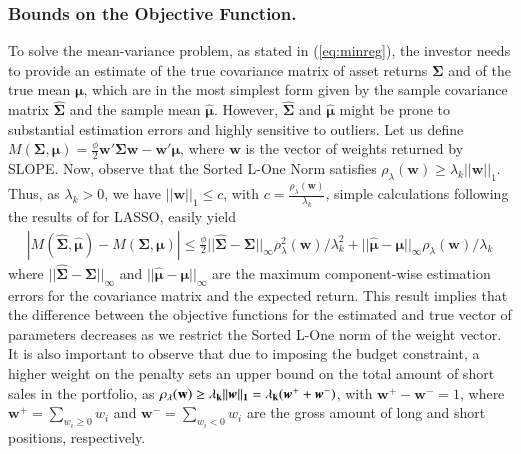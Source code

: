 \documentclass[12pt, a4paper]{article}
\newcommand{\bfw}{\boldsymbol{w} }
\newcommand{\bfmu}{\boldsymbol{\mu} }
\newcommand{\bfSigma}{\boldsymbol{\Sigma} }
\begin{document}
\subsubsection*{Bounds on the Objective Function.}
To solve the mean-variance problem, as stated in (\ref{eq:minreg}), the investor needs to provide an estimate of the true covariance matrix of asset returns $\bfSigma$ and of the true mean $\bfmu$, which are in the most simplest form given by the sample covariance matrix $\hat{\bfSigma}$ and the sample mean $\hat{\bfmu}$. However, $\hat{\bfSigma}$ and $\hat{\bfmu}$ might be prone to substantial estimation errors and highly sensitive to outliers. Let us define $M(\bfSigma, \bfmu)= \frac{\phi}{2} \bfw'\bfSigma \bfw - \bfw'\bfmu$, where $\bfw$ is the vector of weights returned by SLOPE. Now, observe that the Sorted L-One Norm satisfies $\rho_{\lambda}(\bfw)\geq \lambda_k ||\bfw||_1$. Thus, as $\lambda_k>0$, we have $||\bfw||_{1} \leq c$, with $c=\frac{\rho_{\lambda}(\bfw)}{\lambda_{k}}$, simple calculations following the results of \cite{Fan2012} for LASSO, easily yield
\begin{gather}
|M(\widehat{\bfSigma}, \hat{\bfmu}) - M(\bfSigma, \bfmu)| \leq \frac{\phi}{2} ||\widehat{\bfSigma} - \bfSigma||_{\infty} \rho_{\lambda}^2(\bfw)/\lambda^2_k + ||\hat{\bfmu} - \bfmu||_{\infty} \rho_{\lambda}(\bfw)/\lambda_k
\end{gather}
where $||\widehat{\bfSigma} - \bfSigma||_{\infty}$ and $||\hat{\bfmu} - \bfmu||_{\infty}$ are the maximum component-wise estimation errors for the covariance matrix and the expected return. This result implies that the difference between the objective functions for the estimated and true vector of parameters decreases as we restrict the Sorted L-One norm of the weight vector.\\
It is also important to observe that due to imposing the budget constraint, a higher weight on the penalty sets an upper bound on the total amount of short sales in the portfolio, as $\rho_{\lambda}(\bf w)\geq \lambda_k||\bfw||_{1} = \lambda_k(\bfw^{+} + \bfw^{-})$, with $\bfw^{+} - \bfw^{-}=1$, where $\bfw^{+}= \sum\limits_{w_{i} \geq 0} w_{i}$ and $\bfw^{-} = \sum\limits_{w_{i}<0} w_{i}$ are the gross amount of long and short positions, respectively.
\end{document}
